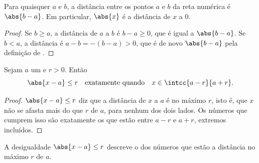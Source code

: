 \begin{proposition}\label{prop:g10:numbers:distance}
Para quaisquer  $a$ e $b$, a distância entre os pontos $a$ e
$b$ da reta numérica é $\abs{b - a}$. Em particular, $\abs{x}$ é a
distância de $x$ a $0$.
\end{proposition}

\begin{proof}
Se $b \geq a$, a distância de $a$ a $b$ é $b - a \geq 0$, que é igual a
$\abs{b-a}$. Se $b < a$, a distância é $a - b = -(b - a) > 0$, que é de
novo $\abs{b - a}$ pela definição de .
\end{proof}

\begin{proposition}\label{prop:g10:numbers:absinterval}
Sejam $a$ um  e $r > 0$. Então
\[
\abs{x - a} \leq r
\quad\text{exatamente quando}\quad
x \in \intcc{a - r}{a + r}.
\]
\end{proposition}

\begin{proof}
$\abs{x-a} \leq r$ diz que a distância de $x$ a $a$ é no máximo $r$, isto
é, que $x$ não se afasta mais do que $r$ de $a$, para nenhum dos dois
lados. Os números que cumprem isso são exatamente os que estão entre
$a - r$ e $a + r$, extremos incluídos.
\end{proof}

\begin{omfigure}

{\small A desigualdade $\abs{x - a} \leq r$ descreve o  dos
números que estão a distância no máximo $r$ de $a$.}
\end{omfigure}

